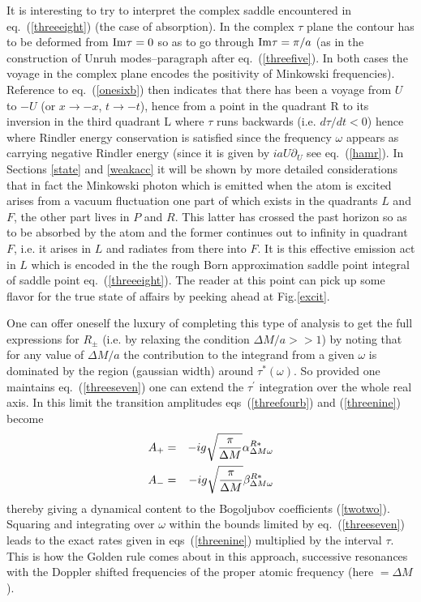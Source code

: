 \documentclass[12pt,oneside]{report}
\def\om{\omega	}
\begin{document}
It is interesting to try to interpret the complex saddle encountered in
eq.~(\ref{threeeight}) (the case of absorption).  In
the complex $\tau$ plane the contour has to be deformed from ${\rm Im} \tau =0$
so as to go through ${\rm Im} \tau =\pi / a$ (as in the construction of Unruh
modes--paragraph after eq.~(\ref{threefive}). In both cases the voyage in
the complex plane encodes the positivity of Minkowski frequencies). Reference to
eq.~(\ref{onesixb}) then indicates that there has been a voyage from $U$ to
$-U$ (or $x\to -x$, $t\to -t$), hence from a point in the quadrant R to its
inversion in the third quadrant L where $\tau$ runs backwards (i.e. 
$d\tau / dt < 0$) hence where Rindler energy conservation is satisfied
since the frequency $\om$ appears as carrying negative Rindler energy
(since it is given by $i aU \partial_U$ see eq.~(\ref{hamr}). 
In  Sections \ref{state} and \ref{weakacc}
it will be shown by more detailed considerations that in fact the Minkowski
photon which is emitted when the atom is excited arises from a vacuum
fluctuation one part of which exists in the quadrants $L$ and $F$, the other
part lives in $P$ and $R$. This latter has crossed the past horizon so as to be
absorbed by the atom and the former continues out to infinity in quadrant $F$,
i.e. it arises in $L$ and radiates from there into $F$. It is this effective
emission act in $L$ which is encoded in the the rough Born approximation saddle
point integral of saddle point eq.~(\ref{threeeight}). The reader at this point
can pick up some flavor for the true state of affairs by peeking ahead at
Fig.\ref{excit}.

One  can offer oneself the luxury of completing this type of analysis to get the
full expressions for $R_\pm$ (i.e. by relaxing the condition 
$\Delta M/ a >> 1$) 
by noting that for any value of $\Delta M / a$ the
contribution to the integrand from a given $\om$ is dominated by the region
(gaussian width) around $\tau^*(\om)$. So provided 
one maintains eq.~(\ref{threeseven})
one can extend the $\tau^\prime$ integration over the whole real
axis. 
In this limit the transition amplitudes eqs~(\ref{threefourb}) and
(\ref{threenine})
 become 
\begin{eqnarray}
A_+ &=& -ig \sqrt{{\pi\over \Delta M}} \alpha_{\Delta M \omega}^{R *}\nonumber\\
A_- &=& -ig
\sqrt{{\pi\over \Delta M}} \beta_{\Delta M \omega}^{R *}
\label{extrab}\end{eqnarray}
thereby giving a dynamical
content to the Bogoljubov coefficients (\ref{twotwo}).
Squaring and integrating
over $\om$ within the bounds limited by eq.~(\ref{threeseven}) leads to
the exact rates given in eqs~(\ref{threenine}) multiplied by the interval
$\tau$. This 
is how the Golden rule comes about in this
approach, successive resonances with the Doppler shifted frequencies of
the proper atomic frequency (here $= \Delta M$).
\end{document}

